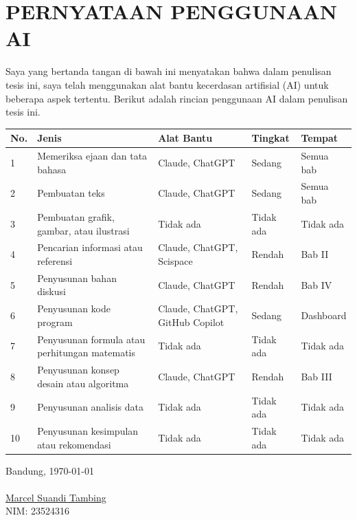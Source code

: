 \chapter*{PERNYATAAN PENGGUNAAN AI}
Saya yang bertanda tangan di bawah ini menyatakan bahwa dalam penulisan tesis ini, saya telah menggunakan alat bantu kecerdasan artifisial (AI) untuk beberapa aspek tertentu. Berikut adalah rincian penggunaan AI dalam penulisan tesis ini.
\begin{table}[h]
\begin{tabular}{|p{0.5cm}| p{4cm} | p{2.5cm} | p{2.5cm} | p{3cm} @{}| }
\hline
\textbf{No.} & \textbf{Jenis} & \textbf{Alat Bantu} & \textbf{Tingkat} & \textbf{Tempat}\\
\hline
1 & Memeriksa ejaan dan tata bahasa & Claude, ChatGPT & Sedang & Semua bab \\
\hline
2 & Pembuatan teks & Claude, ChatGPT & Sedang &Semua bab \\
\hline
3 & Pembuatan grafik, gambar, atau ilustrasi & Tidak ada & Tidak ada & Tidak ada \\
\hline
4 & Pencarian informasi atau referensi & Claude, ChatGPT, Scispace  & Rendah & Bab II \\
\hline
5 & Penyusunan bahan diskusi & Claude, ChatGPT & Rendah & Bab IV \\
\hline
6 & Penyusunan kode program & Claude, ChatGPT, GitHub Copilot & Sedang & Dashboard \\
\hline
7 & Penyusunan formula atau perhitungan matematis & Tidak ada & Tidak ada & Tidak ada \\
\hline
8 & Penyusunan konsep desain atau algoritma & Claude, ChatGPT & Rendah & Bab III \\
\hline
9 & Penyusunan analisis data & Tidak ada & Tidak ada & Tidak ada \\
\hline
10 & Penyusunan kesimpulan atau rekomendasi & Tidak ada & Tidak ada & Tidak ada \\
\hline
\end{tabular}
\end{table}


Bandung, \today\\
\\[2cm]

\underline{Marcel Suandi Tambing} \\
NIM: 23524316